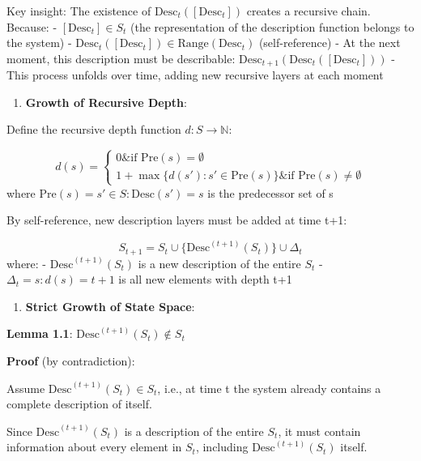   Key insight: The existence of $\text{Desc}_t([\text{Desc}_t])$ creates a recursive chain. Because:
  - $[\text{Desc}_t] \in S_t$ (the representation of the description function belongs to the system)
  - $\text{Desc}_t([\text{Desc}_t]) \in \text{Range}(\text{Desc}_t)$ (self-reference)
  - At the next moment, this description must be describable: $\text{Desc}_{t+1}(\text{Desc}_t([\text{Desc}_t]))$
  - This process unfolds over time, adding new recursive layers at each moment

\begin{enumerate}
\item \textbf{Growth of Recursive Depth}:
\end{enumerate}
  Define the recursive depth function $d: S \to \mathbb{N}$:
  
\begin{equation}
d(s) = \begin{cases}
0 \& \text{if } \text{Pre}(s) = \emptyset \\
1 + \max\{d(s'): s' \in \text{Pre}(s)\} \& \text{if } \text{Pre}(s) \neq \emptyset
\end{cases}
\end{equation}
  where $\text{Pre}(s) = {s' \in S: \text{Desc}(s') = s}$ is the predecessor set of s
  
  By self-reference, new description layers must be added at time t+1:
  
\begin{equation}
S_{t+1} = S_t \cup \{\text{Desc}^{(t+1)}(S_t)\} \cup \Delta_t
\end{equation}
  where:
  - $\text{Desc}^{(t+1)}(S_t)$ is a new description of the entire $S_t$
  - $\Delta_t = {s: d(s) = t+1}$ is all new elements with depth t+1
  
\begin{enumerate}
\item \textbf{Strict Growth of State Space}:
\end{enumerate}
  \textbf{Lemma 1.1}: $\text{Desc}^{(t+1)}(S_t) \notin S_t$
\label{lem:1.1}
  
  \textbf{Proof} (by contradiction):
  
  Assume $\text{Desc}^{(t+1)}(S_t) \in S_t$, i.e., at time t the system already contains a complete description of itself.
  
  Since $\text{Desc}^{(t+1)}(S_t)$ is a description of the entire $S_t$, it must contain information about every element in $S_t$, including $\text{Desc}^{(t+1)}(S_t)$ itself.
  
